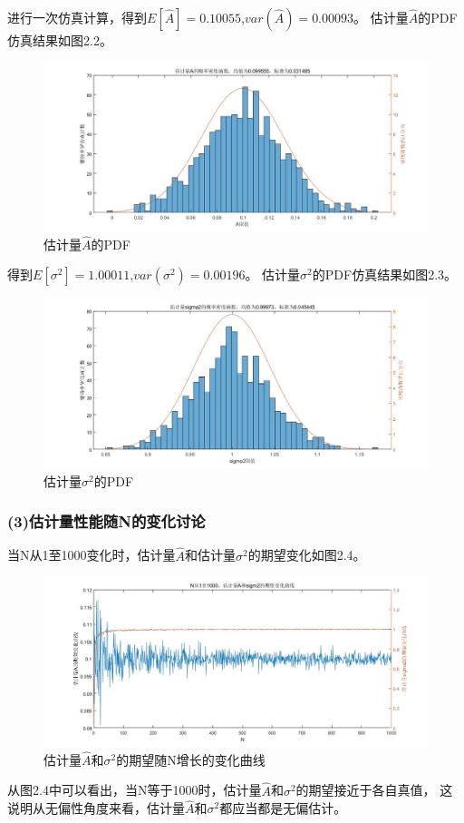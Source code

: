\documentclass[fontset=windows]{article}
\numberwithin{figure}{section}
\begin{document}
进行一次仿真计算，得到\(E[\hat{A}]=0.10055\),\(var(\hat{A})=0.00093\)。
估计量\(\hat{A}\)的PDF仿真结果如图2.2。
\begin{figure}[H]
	\centering
	\includegraphics[scale=0.4]{fig2.2.jpg}
	\caption{估计量\(\hat{A}\)的PDF}
	\label{1.2.2}
\end{figure}

得到\(E[\sigma^2]=1.00011\),\(var(\sigma^2)=0.00196\)。
估计量\(\sigma^2\)的PDF仿真结果如图2.3。
\begin{figure}[H]
	\centering
	\includegraphics[scale=0.4]{fig2.3.jpg}
	\caption{估计量\(\sigma^2\)的PDF}
	\label{1.2.3}
\end{figure}

\subsubsection*{(3)估计量性能随N的变化讨论}


当N从1至1000变化时，估计量\(\hat{A}\)和估计量\(\sigma^2\)的期望变化如图2.4。
\begin{figure}[H]
	\centering
	\includegraphics[scale=0.4]{fig2.4.jpg}
	\caption{估计量\(\hat{A}\)和\(\sigma^2\)的期望随N增长的变化曲线}
	\label{2.4}
\end{figure}
从图2.4中可以看出，当N等于1000时，估计量\(\hat{A}\)和\(\sigma^2\)的期望接近于各自真值，
这说明从无偏性角度来看，估计量\(\hat{A}\)和\(\sigma^2\)都应当都是无偏估计。
\end{document}
